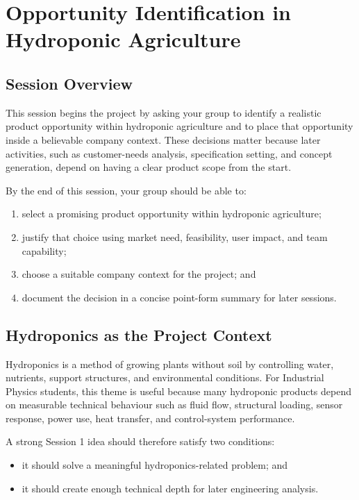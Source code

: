 \chapter{Opportunity Identification in Hydroponic Agriculture}

\section{Session Overview}

This session begins the project by asking your group to identify a realistic product opportunity within hydroponic agriculture and to place that opportunity inside a believable company context. These decisions matter because later activities, such as customer-needs analysis, specification setting, and concept generation, depend on having a clear product scope from the start.

By the end of this session, your group should be able to:
\begin{enumerate}
    \item select a promising product opportunity within hydroponic agriculture;
    \item justify that choice using market need, feasibility, user impact, and team capability;
    \item choose a suitable company context for the project; and
    \item document the decision in a concise point-form summary for later sessions.
\end{enumerate}

\section{Hydroponics as the Project Context}

Hydroponics is a method of growing plants without soil by controlling water, nutrients, support structures, and environmental conditions. For Industrial Physics students, this theme is useful because many hydroponic products depend on measurable technical behaviour such as fluid flow, structural loading, sensor response, power use, heat transfer, and control-system performance.

A strong Session 1 idea should therefore satisfy two conditions:
\begin{itemize}
    \item it should solve a meaningful hydroponics-related problem; and
    \item it should create enough technical depth for later engineering analysis.
\end{itemize}

